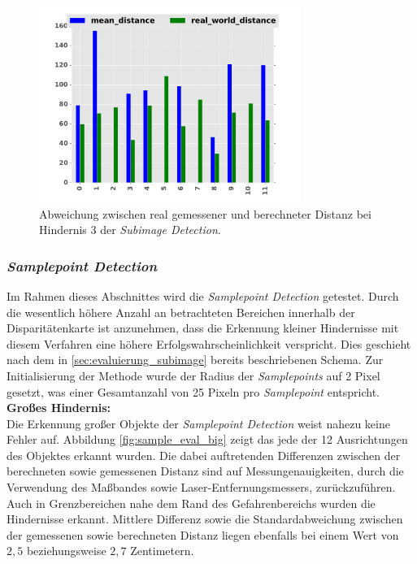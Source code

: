 \begin{figure}[h]
	\centering
	\includegraphics[width=8.5cm]{img/evaluation/diagrams/sub_tiny_bar}
	\caption{Abweichung zwischen real gemessener und berechneter Distanz bei Hindernis 3 der \emph{Subimage Detection}.}
    \label{fig:eval_tiny}
\end{figure}


\pagebreak
\subsubsection{\emph{Samplepoint Detection}}
\label{sec:evaluierung_samplepoint}

\noindent
Im Rahmen dieses Abschnittes wird die \emph{Samplepoint Detection} getestet. Durch die wesentlich höhere Anzahl an betrachteten Bereichen innerhalb der Disparitätenkarte ist anzunehmen, dass die Erkennung kleiner Hindernisse mit diesem Verfahren eine höhere Erfolgswahrscheinlichkeit verspricht. Dies geschieht nach dem in \ref{sec:evaluierung_subimage} bereits beschriebenen Schema. Zur Initialisierung der Methode wurde der Radius der \emph{Samplepoints} auf 2 Pixel gesetzt, was einer Gesamtanzahl von 25 Pixeln pro \emph{Samplepoint} entspricht.\\

\noindent
\textbf{Großes Hindernis:}\\
Die Erkennung großer Objekte der \emph{Samplepoint Detection} weist nahezu keine Fehler auf. Abbildung \ref{fig:sample_eval_big} zeigt das jede der 12 Ausrichtungen des Objektes erkannt wurden. Die dabei auftretenden Differenzen zwischen der berechneten sowie gemessenen Distanz sind auf Messungenauigkeiten, durch die Verwendung des Maßbandes sowie Laser-Entfernungsmessers, zurückzuführen. Auch in Grenzbereichen nahe dem Rand des Gefahrenbereichs wurden die Hindernisse erkannt. Mittlere Differenz sowie die Standardabweichung zwischen der gemessenen sowie berechneten Distanz liegen ebenfalls bei einem Wert von $2,5$ beziehungsweise $2,7$ Zentimetern.\\


